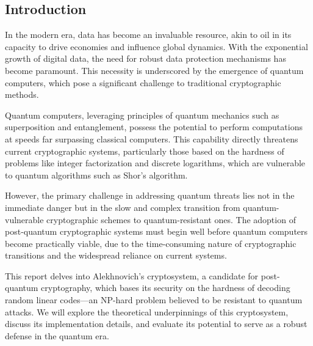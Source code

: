 \begin{center}
\section*{Introduction}
\end{center}

In the modern era, data has become an invaluable resource, akin to oil in its capacity to drive economies and influence global dynamics. With the exponential growth of digital data, the need for robust data protection mechanisms has become paramount. This necessity is underscored by the emergence of quantum computers, which pose a significant challenge to traditional cryptographic methods.

Quantum computers, leveraging principles of quantum mechanics such as superposition and entanglement, possess the potential to perform computations at speeds far surpassing classical computers. This capability directly threatens current cryptographic systems, particularly those based on the hardness of problems like integer factorization and discrete logarithms, which are vulnerable to quantum algorithms such as Shor's algorithm.

However, the primary challenge in addressing quantum threats lies not in the immediate danger but in the slow and complex transition from quantum-vulnerable cryptographic schemes to quantum-resistant ones. The adoption of post-quantum cryptographic systems must begin well before quantum computers become practically viable, due to the time-consuming nature of cryptographic transitions and the widespread reliance on current systems.

This report delves into Alekhnovich’s cryptosystem, a candidate for post-quantum cryptography, which bases its security on the hardness of decoding random linear codes—an NP-hard problem believed to be resistant to quantum attacks. We will explore the theoretical underpinnings of this cryptosystem, discuss its implementation details, and evaluate its potential to serve as a robust defense in the quantum era.
